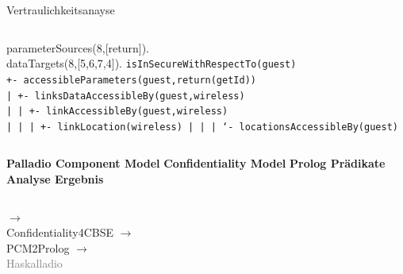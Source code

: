 \documentclass{sdqbeamer}
\begin{document}
\begin{frame}{Vertraulichkeitsanayse}
\begin{columns}[c]
{		parameterSources(8,[return]).\\
		dataTargets(8,[5,6,7,4]).}
	\texttt{\tiny isInSecureWithRespectTo(guest)\\
+- accessibleParameters(guest,return(getId))\\
| +- linksDataAccessibleBy(guest,wireless)\\
| | +- linkAccessibleBy(guest,wireless)\\
| | | +- linkLocation(wireless)
| | | ‘- locationsAccessibleBy(guest)}
\end{columns}
\begin{columns}\centering
	\centering
	\textbf{Palladio Component Model}
	\vspace{0.05\textheight}
	\centering
	\textbf{Confidentiality Model}
	\centering
	\textbf{Prolog Prädikate}
	\centering
	\textbf{Analyse Ergebnis}
\end{columns}
\begin{columns}\centering
{}
\centering
$\longrightarrow$ \\
Confidentiality4CBSE
\centering
$\longrightarrow $\\
PCM2Prolog
\centering
$\longrightarrow$ \\
\textcolor{gray}{Haskalladio}
\end{columns}
\end{frame}	
\end{document}
